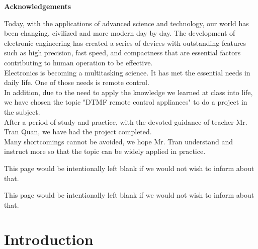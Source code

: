\documentclass[a4paper]{article}
\begin{document}
\begin{center}
\huge
\textbf{Acknowledgements}
\end{center}
Today, with the applications of advanced science and technology, our world has been changing, civilized and more modern day by day. The development of electronic engineering has created a series of devices with outstanding features such as high precision, fast speed, and compactness that are essential factors contributing to human operation to be effective.\\
Electronics is becoming a multitasking science. It has met the essential needs in daily life. One of those needs is remote control.\\
In addition, due to the need to apply the knowledge we learned at class into life, we have chosen the topic "DTMF remote control appliances" to do a project in the subject.\\
After a period of study and practice, with the devoted guidance of teacher Mr. Tran Quan, we have had the project completed.\\
Many shortcomings cannot be avoided, we hope Mr. Tran understand and instruct more so that the topic can be widely applied in practice.
\newpage
\vspace*{\fill}
{\centering This page would be intentionally left blank if we would not wish to inform about that.\par}
\vspace{\fill}
\newpage
\tableofcontents
\newpage
\vspace*{\fill}
{\centering This page would be intentionally left blank if we would not wish to inform about that.\par}
\vspace{\fill}
\newpage
\section{Introduction}
\label{introduction}
\end{document}
